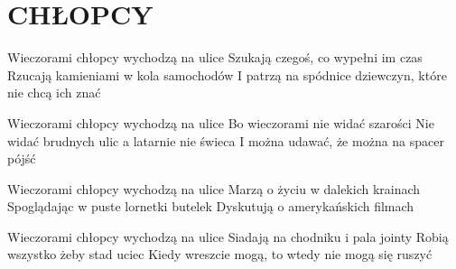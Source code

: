 \documentclass[../../../songbook.tex]{subfiles}
\begin{document}
\TabPositions{8cm} %
\section*{CHŁOPCY}
{}
\vspace{0.5cm}
Wieczorami chłopcy wychodzą na ulice  			 \newline	
Szukają czegoś, co wypełni im czas    			 \newline	
Rzucają kamieniami w kola samochodów \newline
I patrzą na spódnice dziewczyn, które nie chcą ich znać \newline

Wieczorami chłopcy wychodzą na ulice \newline
Bo wieczorami nie widać szarości \newline
Nie widać brudnych ulic a latarnie nie świeca \newline
I można udawać, że można na spacer pójść \newline

Wieczorami chłopcy wychodzą na ulice \newline
Marzą o życiu w dalekich krainach \newline
Spoglądając w puste lornetki butelek \newline
Dyskutują o amerykańskich filmach \newline

Wieczorami chłopcy wychodzą na ulice \newline
Siadają na chodniku i pala jointy \newline
Robią wszystko żeby stad uciec \newline
Kiedy wreszcie mogą, to wtedy nie mogą się ruszyć \newline
\end{document}
